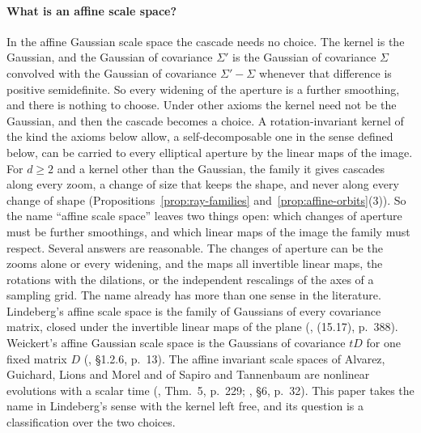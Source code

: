 \paragraph{What is an affine scale space?} In the affine Gaussian scale space the cascade needs no
choice. The kernel is the Gaussian, and the Gaussian of covariance $\Sigma'$ is the
Gaussian of covariance $\Sigma$ convolved with the Gaussian of covariance $\Sigma' - \Sigma$ whenever
that difference is positive semidefinite. So every widening of the aperture is a further smoothing,
and there is nothing to choose. Under other axioms the kernel need not be the Gaussian, and then the
cascade becomes a choice. A rotation-invariant kernel of the kind the axioms below allow, a
self-decomposable one in the sense defined below, can be carried to every elliptical aperture by the
linear maps of the image. For $d \ge 2$ and a kernel other
than the Gaussian, the family it gives cascades along every zoom, a change of size that keeps the
shape, and never along every change of shape (Propositions~\ref{prop:ray-families}
and~\ref{prop:affine-orbits}(3)). So the name ``affine scale space'' leaves two things open: which changes of aperture must be further smoothings, and which
linear maps of the image the family must respect. Several answers are reasonable. The changes of
aperture can be the zooms alone or every widening, and the maps all invertible linear maps, the
rotations with the dilations, or the independent rescalings of the axes of a sampling grid. The
name already has more than one sense in the literature. Lindeberg's affine scale space is the family
of Gaussians of every covariance matrix, closed under the invertible linear maps of the plane
(, (15.17), p.~388). Weickert's affine Gaussian scale space is the
Gaussians of covariance $tD$ for one fixed matrix $D$ (, \S1.2.6,
p.~13). The affine invariant scale spaces of Alvarez, Guichard, Lions and Morel and of Sapiro and
Tannenbaum are nonlinear evolutions with a scalar time (, Thm.~5, p.~229;
, \S6, p.~32). This paper takes the name in Lindeberg's sense with the
kernel left free, and its question is a classification over the two choices.

